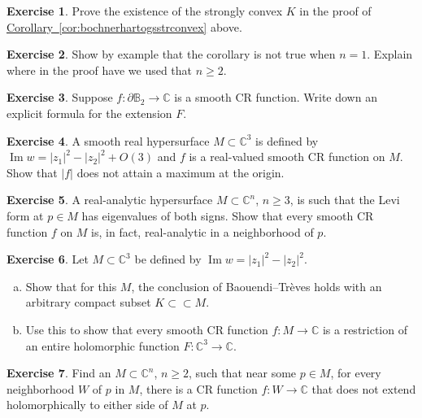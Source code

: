 \documentclass[12pt,openany]{book}
\renewcommand{\Im}{\operatorname{Im}}
\newcommand{\sabs}[1]{\lvert {#1} \rvert}
\newcommand{\C}{{\mathbb{C}}}
\newcommand{\bB}{{\mathbb{B}}}
\theoremstyle{plain}
\theoremstyle{remark}
\theoremstyle{definition}
\newenvironment{exbox}{%
    \def\FrameCommand{\vrule width 1pt \relax\hspace{10pt}}%
    \MakeFramed{\advance\hsize-\width\FrameRestore}%
}{%
    \endMakeFramed
}
\newenvironment{exparts}{%
    \leavevmode\begin{enumerate}[a),noitemsep,topsep=0pt,parsep=0pt,partopsep=0pt]
}{%
    \end{enumerate}
}
\theoremstyle{exercise}
\newtheorem{exercise}{Exercise}[section]
\theoremstyle{example}
\newcommand{\corref}[1]{\hyperref[#1]{Corollary~\ref*{#1}}}
\begin{document}
\begin{exbox}
\begin{exercise}
Prove the existence of the strongly convex $K$ in the proof of
\corref{cor:bochnerhartogsstrconvex} above.
\end{exercise}

\begin{exercise}
Show by example that the corollary is not true when $n=1$.  Explain where in
the proof have we used that $n \geq 2$.
\end{exercise}

\begin{exercise}
Suppose $f \colon \partial \bB_2 \to \C$ is a smooth CR function.
Write down an explicit formula for the extension $F$.
\end{exercise}

\begin{exercise}
A smooth real hypersurface $M \subset \C^3$ is defined by $\Im w = \sabs{z_1}^2-\sabs{z_2}^2 + O(3)$
and $f$ is a real-valued smooth CR function on $M$.  Show
that $\sabs{f}$ does not attain a maximum at the origin.
\end{exercise}

\begin{exercise}
A real-analytic hypersurface
$M \subset \C^n$, $n \geq 3$, is
such that the Levi form at $p \in M$ has eigenvalues of both signs.
Show that every smooth CR function $f$ on $M$ is, in fact, real-analytic in
a neighborhood of $p$.
\end{exercise}

\begin{exercise}
\pagebreak[2]
Let $M \subset \C^3$ be defined by $\Im w = \sabs{z_1}^2-\sabs{z_2}^2$.
\begin{exparts}
\item
Show that for this $M$,
the conclusion of Baouendi--Tr{\`e}ves holds with
an arbitrary compact subset $K \subset \subset M$.
\item
Use this to show that every
smooth CR function $f \colon M \to \C$ is a restriction of an entire holomorphic function
$F \colon \C^3 \to \C$.
\end{exparts}
\end{exercise}

\begin{exercise}
Find an $M \subset \C^n$, $n \geq 2$, such that near some $p \in M$,
for every neighborhood $W$ of $p$ in $M$, there is a CR function $f \colon
W \to \C$ that does not extend holomorphically to either side of $M$ at $p$.
\end{exercise}


\end{exbox}
\end{document}
